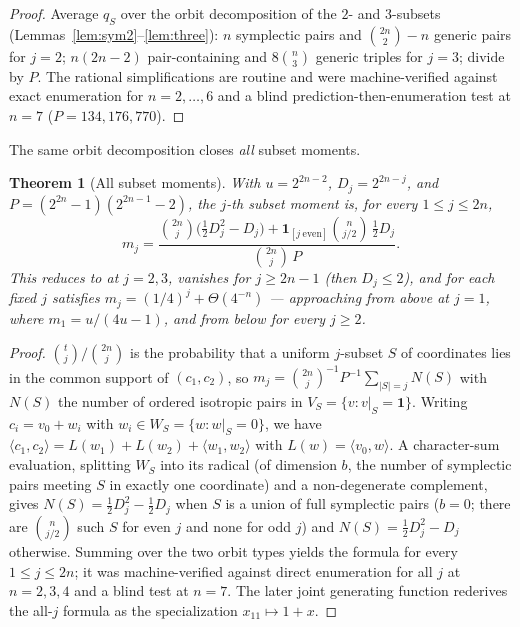 \documentclass[11pt,a4paper]{article}
\theoremstyle{plain}
\newtheorem{theorem}{Theorem}[section]
\theoremstyle{definition}
\begin{document}
\begin{proof}
Average $q_S$ over the orbit decomposition of the $2$- and $3$-subsets (Lemmas~\ref{lem:sym2}--\ref{lem:three}): $n$ symplectic pairs and $\binom{2n}{2}-n$ generic pairs for $j=2$; $n(2n-2)$ pair-containing and $8\binom{n}{3}$ generic triples for $j=3$; divide by $P$. The rational simplifications are routine and were machine-verified against exact enumeration for $n=2,\dots,6$ and a blind prediction-then-enumeration test at $n=7$ ($P=134{,}176{,}770$).
\end{proof}

The same orbit decomposition closes \emph{all} subset moments.

\begin{theorem}[All subset moments]
\label{thm:mj-general}
With $u=2^{2n-2}$, $D_j=2^{2n-j}$, and $P=(2^{2n}-1)(2^{2n-1}-2)$, the $j$-th subset moment is, for every $1\le j\le 2n$,
\[
m_j = \frac{\binom{2n}{j}\bigl(\tfrac12 D_j^2 - D_j\bigr) + \mathbf 1_{[j\ \mathrm{even}]}\binom{n}{j/2}\,\tfrac12 D_j}{\binom{2n}{j}\,P}.
\]
This reduces to  at $j=2,3$, vanishes for $j\ge 2n-1$ (then $D_j\le 2$), and for each fixed $j$ satisfies $m_j = (1/4)^j + \Theta(4^{-n})$ --- approaching from above at $j=1$, where $m_1=u/(4u-1)$, and from below for every $j\ge 2$.
\end{theorem}

\begin{proof}
$\binom{t}{j}/\binom{2n}{j}$ is the probability that a uniform $j$-subset $S$ of coordinates lies in the common support of $(c_1,c_2)$, so $m_j=\binom{2n}{j}^{-1}P^{-1}\sum_{|S|=j}N(S)$ with $N(S)$ the number of ordered isotropic pairs in $V_S=\{v:v|_S=\mathbf 1\}$. Writing $c_i=v_0+w_i$ with $w_i\in W_S=\{w:w|_S=0\}$, we have $\langle c_1,c_2\rangle=L(w_1)+L(w_2)+\langle w_1,w_2\rangle$ with $L(w)=\langle v_0,w\rangle$. A character-sum evaluation, splitting $W_S$ into its radical (of dimension $b$, the number of symplectic pairs meeting $S$ in exactly one coordinate) and a non-degenerate complement, gives $N(S)=\tfrac12 D_j^2-\tfrac12 D_j$ when $S$ is a union of full symplectic pairs ($b=0$; there are $\binom{n}{j/2}$ such $S$ for even $j$ and none for odd $j$) and $N(S)=\tfrac12 D_j^2-D_j$ otherwise. Summing over the two orbit types yields the formula for every $1\le j\le 2n$; it was machine-verified against direct enumeration for all $j$ at $n=2,3,4$ and a blind test at $n=7$. The later joint generating function  rederives the all-$j$ formula as the specialization $x_{11}\mapsto 1+x$.
\end{proof}
\end{document}
